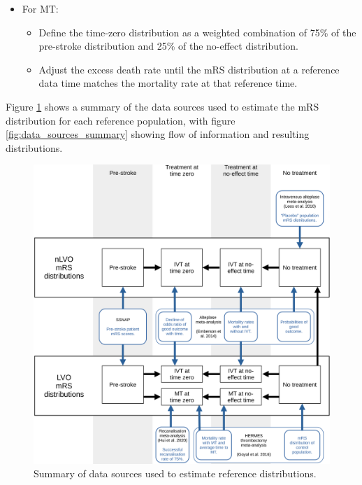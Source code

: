 \begin{enumerate}
\begin{itemize}
\begin{itemize}
        \end{itemize}     
    \end{itemize}
    \begin{itemize}
        \item For MT:
        \begin{itemize}
            \item Define the time-zero distribution as a weighted combination of 75\% of the pre-stroke distribution and 25\% of the no-effect distribution.
            \item Adjust the excess death rate until the mRS distribution at a reference data time matches the mortality rate at that reference time. 
        \end{itemize}
    \end{itemize}    
\end{enumerate}

Figure \ref{fig:data_sources_grid} shows a summary of the data sources used to estimate the mRS distribution for each reference population, with figure \ref{fig:data_sources_summary} showing flow of information and resulting distributions.

\begin{figure}[h!]
    \centering
    \includegraphics[width=1.0\linewidth]{images_modelling/data_sources.png}
    \caption{Summary of data sources used to estimate reference distributions.}
    \label{fig:data_sources_grid}
\end{figure}

